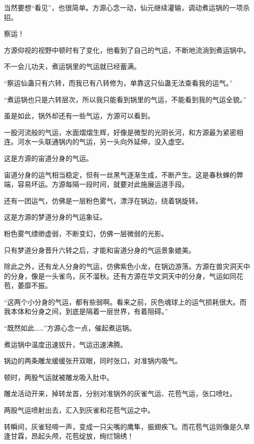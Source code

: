 \begin{this_body}
当然要想“看见”，也很简单。方源心念一动，仙元继续灌输，调动煮运锅的一项杀招。

察运！

方源仰视的视野中顿时有了变化，他看到了自己的气运，不断地流淌到煮运锅中。

不一会儿功夫，煮运锅里的气运就已经蓄满。

“察运仙蛊只有六转，而我已有八转修为，单靠这只仙蛊无法查看我的运气。”

“煮运锅也只是六转层次，所以我只能看到锅里的气运，不能看到我的气运全貌。”

虽是如此，锅外却还有一些气运，方源可以看到。

一股河流般的气运，水面熠熠生辉，好像是微型的光阴长河，和方源最为紧密相连。河水一头联通锅内的气运，另一头向外延伸，没入虚空。

这是方源的宙道分身的气运。

宙道分身的运气相当稳定，但有一丝黑气逐渐生成，不断产生。这是春秋蝉的弊端，容易坏运。方源每隔一段时间，就要对此施展运道手段。

还有一团运气，仿佛是一层粉色雾气，漂浮在锅边，绕着锅旋转。

这是方源的梦道分身的气运象征。

粉色雾气缥缈虚弱，不断变幻，仿佛一层微弱的光影。

只有梦道分身晋升六转之后，才能和宙道分身的气运景象媲美。

除此之外，还有龙人分身的气运，仿佛紫色小龙，在锅边游荡。方源在兽灾洞天中的分身，像是一头雀鸟，灰不溜秋。还有方源在华文洞天中的分身，气运如同花苞，萎靡不振。

“这两个小分身的气运，都有些弱啊。看来之前，灰色魂球上的运气损耗很大。而我本体和分身之间，到底是隔着一层世界，有着阻碍。”

“既然如此……”方源心念一点，催起煮运锅。

煮运锅中温度迅速拔升，气运迅速沸腾。

锅边的两条雕龙缓缓张开双眼，同时张口，对准锅内吸气。

顿时，两股气运就被雕龙吸入肚中。

雕龙活动开来，掉转龙首，分别对准锅外的灰雀气运、花苞气运，张口喷吐。

两股气运喷射出去，汇入到灰雀和花苞气运之中。

转瞬间，灰雀轻啼一声，变成一只尖嘴的鹰隼，振翅疾飞。而花苞气运则像是久旱逢甘霖，昂起头颅，花苞绽放，绚烂锦绣！

\end{this_body}

